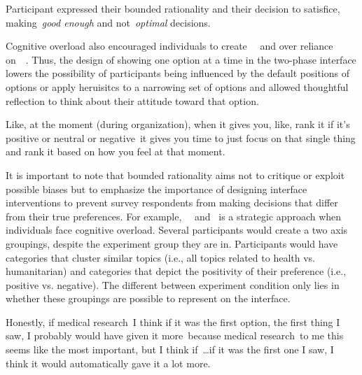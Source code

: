 Participant expressed their bounded rationality and their decision to satisfice, making~\textit{good enough} and not~\textit{optimal} decisions.

Cognitive overload also encouraged individuals to create~\underline{}~\cite{tverskyJudgmentUncertaintyHeuristics1974} and over reliance on~\underline{}~\cite{thalerNudgeImprovingDecisions2008a}. Thus, the design of showing one option at a time in the two-phase interface lowers the possibility of participants being influenced by the default positions of options or apply heruisitcs to a narrowing set of options and allowed thoughtful reflection to think about their attitude toward that option.

\begin{displayquote}
Like, at the moment (during organization), when it gives you, like, rank it if it's positive or neutral or negative~\bracketellipsis it gives you time to just focus on that single thing and rank it based on how you feel at that moment. \hfill{}
\end{displayquote}

It is important to note that bounded rationality aims not to critique or exploit possible biases but to emphasize the importance of designing interface interventions to prevent survey respondents from making decisions that differ from their true preferences. For example,~\underline{}~\cite{simonSciencesArtificial1996} and~\underline{} is a strategic approach when individuals face cognitive overload. Several participants would create a two axis groupings, despite the experiment group they are in. Participants would have categories that cluster similar topics (i.e., all topics related to health vs. humanitarian) and categories that depict the positivity of their preference (i.e., positive vs. negative). The different between experiment condition only lies in whether these groupings are possible to represent on the interface.

\begin{displayquote}
    Honestly, if medical research~\bracketellipsis I think if it was the first option, the first thing I saw, I probably would have given it more~\bracketellipsis because medical research~\bracketellipsis to me this seems like the most important, but I think if~\ldots if it was the first one I saw, I think it would automatically gave it a lot more. \hfill{}
\end{displayquote}

